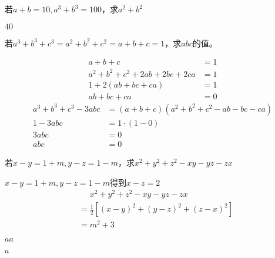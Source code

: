 \documentclass[windows,csize4,answers]{BHCexam}
\begin{document}
\begin{groups}
\begin{questions}[]
        \question[5] 若$a+b=10, a^3+b^3=100$，求$a^2+b^2$
        \begin{solution}{0.5cm}
            \methodonly $40$
        \end{solution}
        \vspace{3.5cm}

        \question[5] 若$a^3+b^3+c^3=a^2+b^2+c^2=a+b+c=1$，求$abc$的值。
        \begin{solution}{0.5cm}
            \methodonly
            \[
                \begin{aligned}
                    a+b+c&=1 \\ 
                    a^2+b^2+c^2+2ab+2bc+2ca&=1 \\ 
                    1+2(ab+bc+ca)&=1 \\ 
                    ab+bc+ca&=0
                \end{aligned}
            \]
            \[
                \begin{aligned}
                    a^3+b^3+c^3-3abc&=(a+b+c)(a^2+b^2+c^2-ab-bc-ca) \\ 
                    1-3abc&=1\cdot(1-0) \\ 
                    3abc&=0 \\
                    abc&=0
                \end{aligned}
            \]
        \end{solution}
        \vspace{3.5cm}

        \question[5] 若$x-y=1+m, y-z=1-m$，求$x^2+y^2+z^2-xy-yz-zx$
        \begin{solution}{0.5cm}
            \methodonly $x-y=1+m, y-z=1-m$得到$x-z=2$
            \[
                \begin{aligned}
                    &\phantom{=}x^2+y^2+z^2-xy-yz-zx \\ 
                    &=\frac{1}{2}[(x-y)^2+(y-z)^2+(z-x)^2] \\ 
                    &=m^2+3
                \end{aligned}
            \]
        \end{solution}
        \vspace{3.5cm}


        \question[5] $aa$
        \begin{solution}{0.5cm}
            \methodonly $a$
        \end{solution}
        \vspace{3.5cm}

    \end{questions}

\end{groups}


\label{lastpage}
\end{document}
